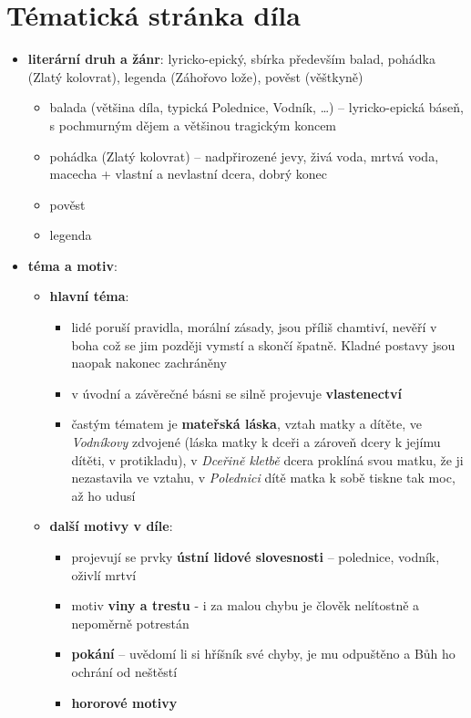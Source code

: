 \documentclass[10pt,a4paper]{article}
\begin{document}
\section*{Tématická stránka díla}
\begin{itemize}
\item \textbf{literární druh a žánr}: lyricko-epický, sbírka především balad, pohádka (Zlatý kolovrat), legenda (Záhořovo lože), pověst (věštkyně)
	\begin{itemize}
	\item balada (většina díla, typická Polednice, Vodník, \ldots) -- lyricko-epická báseň, s pochmurným dějem a většinou tragickým koncem
	\item pohádka (Zlatý kolovrat) -- nadpřirozené jevy, živá voda, mrtvá voda, macecha + vlastní a nevlastní dcera, dobrý konec
	\item pověst 
	\item legenda
	\end{itemize}
\item \textbf{téma a motiv}: 
	\begin{itemize}
	\item \textbf{hlavní téma}:
		\begin{itemize}
		\item lidé poruší pravidla, morální zásady, jsou příliš chamtiví, nevěří v boha což se jim později vymstí a skončí špatně. Kladné postavy jsou naopak nakonec zachráněny
		\item v úvodní a závěrečné básni se silně projevuje \textbf{vlastenectví}
		\item častým tématem je \textbf{mateřská láska}, vztah matky a dítěte, ve \textit{Vodníkovy} zdvojené (láska matky k dceři a zároveň dcery k jejímu dítěti, v protikladu), v \textit{Dceřině kletbě} dcera proklíná svou matku, že ji nezastavila ve vztahu, v \textit{Polednici} dítě matka k sobě tiskne tak moc, až ho udusí
		\end{itemize}		 
	\item \textbf{další motivy v díle}:
		\begin{itemize}
		\item projevují se prvky \textbf{ústní lidové slovesnosti} -- polednice, vodník, oživlí mrtví
		\item motiv \textbf{viny a trestu} - i za malou chybu je člověk nelítostně a nepoměrně potrestán
		\item \textbf{pokání} -- uvědomí li si hříšník své chyby, je mu odpuštěno a Bůh ho ochrání od neštěstí
		\item \textbf{hororové motivy}

\end{itemize}
\end{itemize}
\end{itemize}
\end{document}

